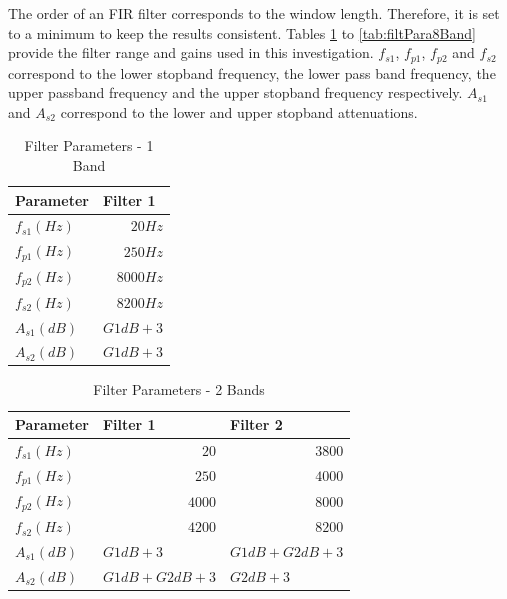 \documentclass[12pt, onecolumn]{article}
\begin{document}
\begin{appendices}
\noindent The order of an FIR filter corresponds to the window length. Therefore, it is set to a minimum to keep the results consistent. Tables \ref{tab:filtPara1Band} to \ref{tab:filtPara8Band} provide the filter range and gains used in this investigation. $f_{s1}$, $f_{p1}$, $f_{p2}$ and $f_{s2}$ correspond to the lower stopband frequency, the lower pass band frequency, the upper passband frequency and the upper stopband frequency respectively. $A_{s1}$ and $A_{s2}$ correspond to the lower and upper stopband attenuations.

\begin{table}[htbp]
  \centering
  \caption{Filter Parameters - 1 Band}
    \begin{tabular}{|l|l|}
    \hline
    \textbf{Parameter} & \textbf{Filter 1} \\
    \hline
    $f_{s1} (Hz)$   & \multicolumn{1}{r|}{$20Hz$} \\
    \hline
    $f_{p1} (Hz)$   & \multicolumn{1}{r|}{$250Hz$} \\
    \hline
    $f_{p2} (Hz)$   & \multicolumn{1}{r|}{$8000Hz$} \\
    \hline
    $f_{s2} (Hz)$   & \multicolumn{1}{r|}{$8200Hz$} \\
    \hline
    $A_{s1} (dB)$   & $G1dB + 3$ \\
    \hline
    $A_{s2} (dB)$   & $G1dB + 3$ \\
    \hline
    \end{tabular}%
  \label{tab:filtPara1Band}%
\end{table}%


\begin{table}[htbp]
  \centering
  \caption{Filter Parameters - 2 Bands}
    \begin{tabular}{|l|l|l|}
    \hline
    \textbf{Parameter} & \textbf{Filter 1} & \textbf{Filter 2} \\
    \hline
    $f_{s1} (Hz)$   & \multicolumn{1}{r|}{$20$} & \multicolumn{1}{r|}{$ 3800$ } \\
    \hline
    $f_{p1} (Hz)$  & \multicolumn{1}{r|}{$250$} & \multicolumn{1}{r|}{$4000$} \\
    \hline
    $f_{p2} (Hz)$   & \multicolumn{1}{r|}{$ 4000$ } & \multicolumn{1}{r|}{$8000$} \\
    \hline
    $f_{s2} (Hz)$   & \multicolumn{1}{r|}{$ 4200$ } & \multicolumn{1}{r|}{$8200$} \\
    \hline
    $A_{s1} (dB)$   & $G1dB + 3$ & $G1dB + G2dB + 3$ \\
    \hline
    $A_{s2} (dB)$   & $G1dB + G2dB + 3$ & $G2dB + 3$ \\
    \hline
    \end{tabular}%
  \label{tab:filtPara2Band}%
\end{table}%


\end{appendices}
\end{document}
